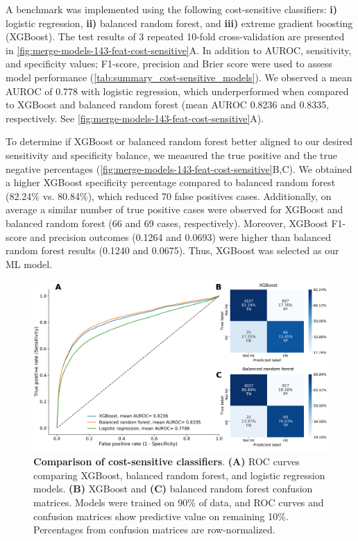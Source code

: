 A benchmark was implemented using the following cost-sensitive classifiers: \textbf{i)} logistic regression, \textbf{ii)} balanced random forest, and \textbf{iii)} extreme gradient boosting (XGBoost). The test results of 3 repeated 10-fold cross-validation are presented in \autoref{fig:merge-models-143-feat-cost-sensitive}A. In addition to AUROC, sensitivity, and specificity values; F1-score, precision and Brier score were used to assess model performance (\autoref{tab:summary_cost-sensitive_models}).  We observed a mean AUROC of 0.778 with logistic regression, which underperformed when compared to XGBoost and balanced random forest (mean AUROC 0.8236 and 0.8335, respectively. See \autoref{fig:merge-models-143-feat-cost-sensitive}A). 

To determine if XGBoost or balanced random forest better aligned to our desired sensitivity and specificity balance, we measured the true positive and the true negative percentages (\autoref{fig:merge-models-143-feat-cost-sensitive}B,C). We obtained a higher XGBoost specificity percentage compared to balanced random forest (82.24\% vs. 80.84\%), which reduced 70 false positives cases. Additionally, on average a similar number of true positive cases were observed for XGBoost and balanced random forest (66 and 69 cases, respectively). Moreover, XGBoost F1-score and precision outcomes (0.1264 and 0.0693) were higher than balanced random forest results (0.1240 and 0.0675). Thus, XGBoost was selected as our ML model. 

\begin{figure}[ht!]
  \centering
  \includegraphics[scale=0.35]{plots/results/ml/merge.xgboost.brf.logit.143.features.costsensitive.pdf}
  \caption[Comparison of cost-sensitive classifiers]{\textbf{Comparison of cost-sensitive classifiers}. \textbf{(A)} ROC curves comparing XGBoost, balanced random forest, and logistic regression models. \textbf{(B)} XGBoost and \textbf{(C)} balanced random forest confusion matrices. Models were trained on 90\% of data, and ROC curves and confusion matrices show predictive value on remaining 10\%. Percentages from confusion matrices are row-normalized.}
  \label{fig:merge-models-143-feat-cost-sensitive}
\end{figure}

